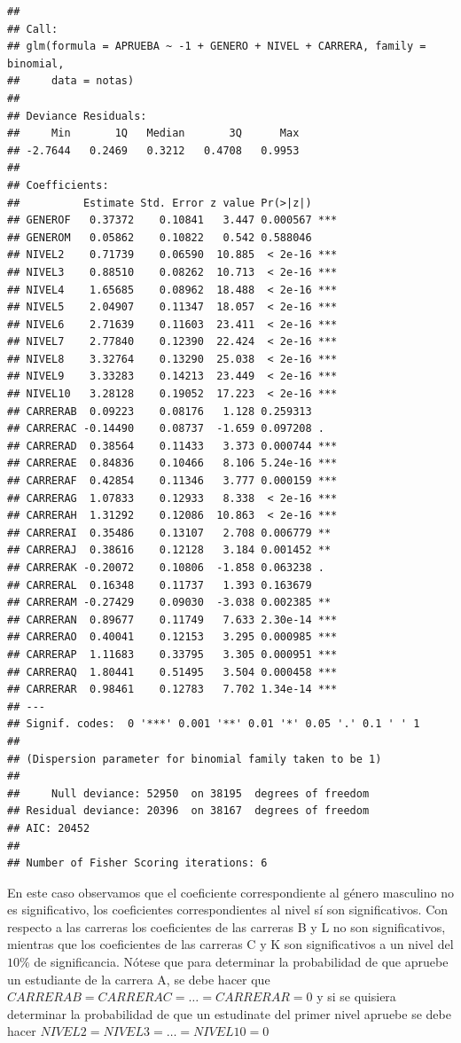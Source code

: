 \documentclass[letterpaper,]{book}
\begin{document}
\begin{verbatim}
## 
## Call:
## glm(formula = APRUEBA ~ -1 + GENERO + NIVEL + CARRERA, family = binomial, 
##     data = notas)
## 
## Deviance Residuals: 
##     Min       1Q   Median       3Q      Max  
## -2.7644   0.2469   0.3212   0.4708   0.9953  
## 
## Coefficients:
##          Estimate Std. Error z value Pr(>|z|)    
## GENEROF   0.37372    0.10841   3.447 0.000567 ***
## GENEROM   0.05862    0.10822   0.542 0.588046    
## NIVEL2    0.71739    0.06590  10.885  < 2e-16 ***
## NIVEL3    0.88510    0.08262  10.713  < 2e-16 ***
## NIVEL4    1.65685    0.08962  18.488  < 2e-16 ***
## NIVEL5    2.04907    0.11347  18.057  < 2e-16 ***
## NIVEL6    2.71639    0.11603  23.411  < 2e-16 ***
## NIVEL7    2.77840    0.12390  22.424  < 2e-16 ***
## NIVEL8    3.32764    0.13290  25.038  < 2e-16 ***
## NIVEL9    3.33283    0.14213  23.449  < 2e-16 ***
## NIVEL10   3.28128    0.19052  17.223  < 2e-16 ***
## CARRERAB  0.09223    0.08176   1.128 0.259313    
## CARRERAC -0.14490    0.08737  -1.659 0.097208 .  
## CARRERAD  0.38564    0.11433   3.373 0.000744 ***
## CARRERAE  0.84836    0.10466   8.106 5.24e-16 ***
## CARRERAF  0.42854    0.11346   3.777 0.000159 ***
## CARRERAG  1.07833    0.12933   8.338  < 2e-16 ***
## CARRERAH  1.31292    0.12086  10.863  < 2e-16 ***
## CARRERAI  0.35486    0.13107   2.708 0.006779 ** 
## CARRERAJ  0.38616    0.12128   3.184 0.001452 ** 
## CARRERAK -0.20072    0.10806  -1.858 0.063238 .  
## CARRERAL  0.16348    0.11737   1.393 0.163679    
## CARRERAM -0.27429    0.09030  -3.038 0.002385 ** 
## CARRERAN  0.89677    0.11749   7.633 2.30e-14 ***
## CARRERAO  0.40041    0.12153   3.295 0.000985 ***
## CARRERAP  1.11683    0.33795   3.305 0.000951 ***
## CARRERAQ  1.80441    0.51495   3.504 0.000458 ***
## CARRERAR  0.98461    0.12783   7.702 1.34e-14 ***
## ---
## Signif. codes:  0 '***' 0.001 '**' 0.01 '*' 0.05 '.' 0.1 ' ' 1
## 
## (Dispersion parameter for binomial family taken to be 1)
## 
##     Null deviance: 52950  on 38195  degrees of freedom
## Residual deviance: 20396  on 38167  degrees of freedom
## AIC: 20452
## 
## Number of Fisher Scoring iterations: 6
\end{verbatim}

En este caso observamos que el coeficiente correspondiente al género masculino no es significativo, los coeficientes correspondientes al nivel sí son significativos. Con respecto a las carreras los coeficientes de las carreras B y L no son significativos, mientras que los coeficientes de las carreras C y K son significativos a un nivel del \(10\%\) de significancia. Nótese que para determinar la probabilidad de que apruebe un estudiante de la carrera A, se debe hacer que \(CARRERAB=CARRERAC=\ldots=CARRERAR=0\) y si se quisiera determinar la probabilidad de que un estudinate del primer nivel apruebe se debe hacer \(NIVEL2=NIVEL3=\ldots=NIVEL10=0\)
\end{document}
